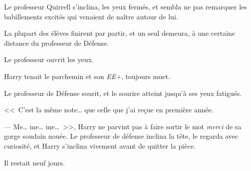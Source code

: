 Le professeur Quirrell s'inclina, les yeux fermés, et sembla ne pas remarquer les babillements excités qui venaient de naître autour de lui.

La plupart des élèves finirent par partir, et un seul demeura, à une certaine distance du professeur de Défense.

Le professeur ouvrit les yeux.

Harry tenait le parchemin et son \emph{EE+}, toujours muet.

Le professeur de Défense sourit, et le sourire atteint jusqu'à ses yeux fatigués.

<<~C'est la même note… que celle que j'ai reçue en première année.

--- Me… me… me…~>>, Harry ne parvint pas à faire sortir le mot \emph{merci} de sa gorge soudain nouée. Le professeur de défense inclina la tête, le regarda avec curiosité, et Harry s'inclina vivement avant de quitter la pièce.

Il restait neuf jours.
